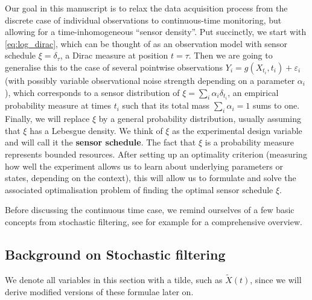 \documentclass[10pt]{article}
\numberwithin{equation}{section}
\numberwithin{figure}{section}
\theoremstyle{remark}
\newcommand{\eps}{\varepsilon}
\begin{document}
{Our goal in this manuscript is to relax the data acquisition process from the discrete case of individual observations to continuous-time monitoring, but allowing for a time-inhomogeneous ``sensor density''. Put succinctly, we start with \eqref{eq:log_dirac}, which can be thought of as an observation model with sensor schedule $\xi = \delta_\tau$, a Dirac measure at position $t=\tau$. Then we are going to generalise this to the case of several pointwise observations $Y_i = g(X_{t_i}, t_i) + \eps_i$ (with possibly variable observational noise strength depending on a parameter $\alpha_i$), which corresponds to a sensor distribution of $\xi = \sum_i \alpha_i \delta_{t_i}$, an empirical probability measure at times $t_i$ such that its total mass $\sum_i \alpha_i = 1$ sums to one. Finally, we will replace $\xi$ by a general probability distribution, usually assuming that $\xi$ has a Lebesgue density. We think of $\xi$ as the experimental design variable and will call it the \textbf{sensor schedule}. The fact that $\xi$ is a probability measure represents bounded resources. After setting up an optimality criterion (measuring how well the experiment allows us to learn about underlying parameters or states, depending on the context), this will allow us to formulate and solve the associated optimalisation problem of finding the optimal sensor schedule $\xi$.
}

Before discussing the continuous time case, we remind ourselves of a few basic concepts from stochastic filtering, see for example \cite{bain2009fundamentals} for a comprehensive overview.

\subsection{Background on Stochastic filtering}
We denote all variables in this section with a tilde, such as $\tilde X(t)$, since we will derive modified versions of these formulae later on.
\end{document}
